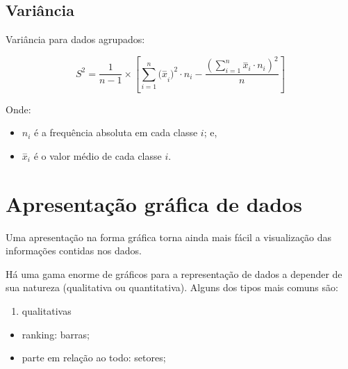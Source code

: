 \documentclass[
]{book}
\providecommand{\tightlist}{%
  \setlength{\itemsep}{0pt}\setlength{\parskip}{0pt}}
\begin{document}
\hfill\break

\hypertarget{variuxe2ncia}{%
\subsection{Variância}\label{variuxe2ncia}}

\hfill\break

Variância para dados agrupados:

\hfill\break

\[
S^{2}= \frac{1}{n-1} \times \left[  \sum _{i=1}^{n}{(\stackrel{-}{x}}_{i})^{2} \cdot {n}_{i} - \frac{{\left(\sum _{i=1}^{n}{\stackrel{-}{x}}_{i} \cdot {n}_{i}\right)}^{2}  }{n}\right]
\]

\hfill\break

Onde:

\hfill\break

\begin{itemize}
\tightlist
\item
  \(n_{i}\) é a frequência absoluta em cada classe \(i\); e,
\item
  \(\stackrel{-}{x}_{i}\) é o valor médio de cada classe \(i\).
\end{itemize}

\hfill\break

\hypertarget{apresentauxe7uxe3o-gruxe1fica-de-dados}{%
\section{Apresentação gráfica de dados}\label{apresentauxe7uxe3o-gruxe1fica-de-dados}}

\hfill\break

Uma apresentação na forma gráfica torna ainda mais fácil a visualização das informações contidas nos dados.

\hfill\break

Há uma gama enorme de gráficos para a representação de dados a depender de sua natureza (qualitativa ou quantitativa). Alguns dos tipos mais comuns são:

\hfill\break

\begin{enumerate}
\def\labelenumi{\arabic{enumi}.}
\tightlist
\item
  qualitativas
\end{enumerate}

\hfill\break

\begin{itemize}
\tightlist
\item
  ranking: barras;
\item
  parte em relação ao todo: setores;
\end{itemize}
\end{document}
